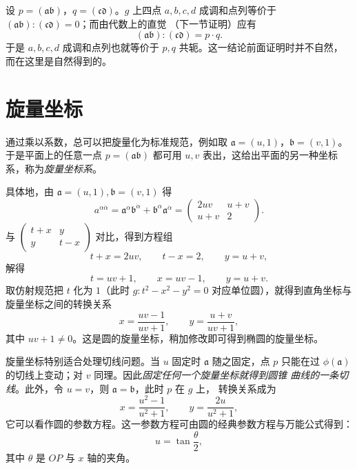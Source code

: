 设 $p=(\mathfrak a\mathfrak b)$，$q=(\mathfrak c\mathfrak d)$。$g$ 上四点 $a,b,c,d$
成调和点列等价于 $(\mathfrak a\mathfrak b):(\mathfrak c\mathfrak d)=0$；而由代数上的直觉
（下一节证明）应有
\[
(\mathfrak a\mathfrak b):(\mathfrak c\mathfrak d)=p\cdot q .
\]
于是 $a,b,c,d$ 成调和点列也就等价于 $p,q$ 共轭。这一结论前面证明时并不自然，
而在这里是自然得到的。

\section{旋量坐标}

通过乘以系数，总可以把旋量化为标准规范，例如取
$\mathfrak a=(u,1)$，$\mathfrak b=(v,1)$。于是平面上的任意一点 $p=(\mathfrak a\mathfrak b)$
都可用 $u,v$ 表出，这给出平面的另一种坐标系，称为\emph{旋量坐标系}。

具体地，由 $\mathfrak a=(u,1),\mathfrak b=(v,1)$ 得
\[
a^{\alpha\dot\alpha}
=\mathfrak a^\alpha\mathfrak b^{\dot\alpha}+\mathfrak b^\alpha\mathfrak a^{\dot\alpha}
=\begin{pmatrix} 2uv & u+v\\ u+v & 2\end{pmatrix}.
\]
与 $\begin{pmatrix} t+x & y\\ y & t-x\end{pmatrix}$ 对比，得到方程组
\[
t+x=2uv,\qquad t-x=2,\qquad y=u+v,
\]
解得
\[
t=uv+1,\qquad x=uv-1,\qquad y=u+v .
\]
取仿射规范把 $t$ 化为 $1$（此时 $g:t^2-x^2-y^2=0$ 对应单位圆），就得到直角坐标与
旋量坐标之间的转换关系
\[
x=\frac{uv-1}{uv+1},\qquad y=\frac{u+v}{uv+1},
\]
其中 $uv+1\neq0$。这是圆的旋量坐标，稍加修改即可得到椭圆的旋量坐标。

旋量坐标特别适合处理切线问题。当 $u$ 固定时 $\mathfrak a$ 随之固定，点 $p$ 只能在过
$\phi(\mathfrak a)$ 的切线上变动；对 $v$ 同理。因此\emph{固定任何一个旋量坐标就得到圆锥
曲线的一条切线}。此外，令 $u=v$，则 $\mathfrak a=\mathfrak b$，此时 $p$ 在 $g$ 上，
转换关系成为
\[
x=\frac{u^2-1}{u^2+1},\qquad y=\frac{2u}{u^2+1},
\]
它可以看作圆的参数方程。这一参数方程可由圆的经典参数方程与万能公式得到：
\[
u=\tan\frac\theta2,
\]
其中 $\theta$ 是 $OP$ 与 $x$ 轴的夹角。
